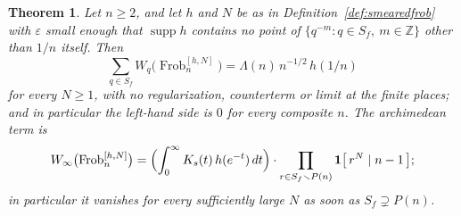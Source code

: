\documentclass[11pt]{amsart}
\newtheorem{theorem}{Theorem}[section]
\theoremstyle{definition}
\theoremstyle{remark}
\newcommand{\Z}{\mathbb Z}
\newcommand{\Frob}{\operatorname{Frob}}
\newcommand{\supp}{\operatorname{supp}}
\begin{document}
\begin{theorem}\label{thm:frobcontact}
Let $n\ge2$, and let $h$ and $N$ be as in Definition~\ref{def:smearedfrob}
with $\varepsilon$ small enough that $\supp h$ contains no point of
$\{q^{-m}:q\in S_f,\ m\in\Z\}$ other than $1/n$ itself. Then
\begin{equation}\label{eq:frobcontacteq}
  \sum_{q\in S_f}W_q\bigl(\Frob_n^{[h,N]}\bigr)
   =\Lambda(n)\,n^{-1/2}\,h(1/n)
\end{equation}
for every $N\ge1$, with no regularization, counterterm or limit at the
finite places; and in particular the left-hand side is $0$ for
every composite $n$. The archimedean term is
\begin{equation}\label{eq:frobarch}
  W_\infty\bigl(\Frob_n^{[h,N]}\bigr)
   =\Bigl(\int_0^\infty K_s(t)\,h(e^{-t})\,dt\Bigr)\cdot
     \prod_{r\in S_f\smallsetminus P(n)}\mathbf 1\bigl[\,r^N\mid n-1\,\bigr];
\end{equation}
in particular it vanishes for every sufficiently large $N$ as soon as
$S_f\supsetneq P(n)$.
\end{theorem}
\end{document}
